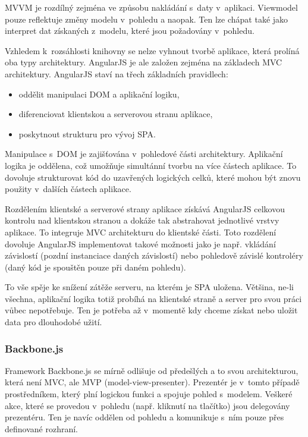 MVVM je rozdílný zejména ve způsobu nakládání s~daty v~aplikaci. Viewmodel pouze reflektuje změny modelu v~pohledu a naopak. Ten lze chápat také jako interpret dat získaných z~modelu, které jsou požadovány v~pohledu.

Vzhledem k~rozsáhlosti knihovny se nelze vyhnout tvorbě aplikace, která prolíná oba typy architektury. AngularJS je ale založen zejména na základech MVC architektury. AngularJS staví na třech základních pravidlech:

\begin{itemize}
    \item oddělit manipulaci DOM a aplikační logiku,
    \item diferenciovat klientskou a serverovou stranu aplikace,
    \item poskytnout strukturu pro vývoj SPA.
\end{itemize}

Manipulace s~DOM je zajišťována v~pohledové části architektury. Aplikační logika je oddělena, což umožňuje simultánní tvorbu na více částech aplikace. To dovoluje strukturovat kód do uzavřených logických celků, které mohou být znovu použity v~dalších částech aplikace.

Rozdělením klientské a serverové strany aplikace získává AngularJS celkovou kontrolu nad klientskou stranou a dokáže tak abstrahovat jednotlivé vrstvy aplikace. To integruje MVC architekturu do klientské části. Toto rozdělení dovoluje AngularJS implementovat takové možnosti jako je např. vkládání závislostí (pozdní instanciace daných závislostí) nebo pohledově závislé kontroléry (daný kód je spouštěn pouze při daném pohledu).

To vše spěje ke snížení zátěže serveru, na kterém je SPA uložena. Většina, ne-li všechna, aplikační logika totiž probíhá na klientské straně a server pro svou práci vůbec nepotřebuje. Ten je potřeba až v~momentě kdy chceme získat nebo uložit data pro dlouhodobé užití.

\subsubsection*{Backbone.js}

Framework Backbone.js se mírně odlišuje od předešlých a to svou architekturou, která není MVC, ale MVP (model-view-presenter). Prezentér je v~tomto případě prostředníkem, který plní logickou funkci a spojuje pohled s~modelem. Veškeré akce, které se provedou v~pohledu (např. kliknutí na tlačítko) jsou delegovány prezentéru. Ten je navíc oddělen od pohledu a komunikuje s~ním pouze přes definované rozhraní.

